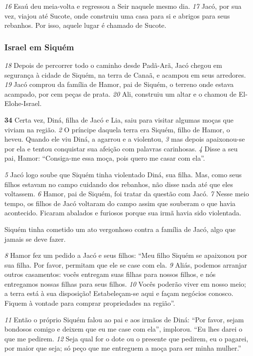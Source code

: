 \bigskip   
\textit{\tiny 16}
Esaú deu meia-volta e regressou a Seir naquele mesmo dia. 
\textit{\tiny 17}
Jacó, por sua
vez, viajou até Sucote, onde construiu uma casa para si e abrigos para seus
rebanhos. Por isso, aquele lugar é chamado de Sucote.

\bigskip   
\subsubsection*{Israel em Siquém}
\textit{\tiny 18}
Depois de percorrer todo o caminho desde Padã-Arã, Jacó chegou em
segurança à cidade de Siquém, na terra de Canaã, e acampou em seus arredores.
\textit{\tiny 19}
Jacó comprou da família de Hamor, pai de Siquém, o terreno onde estava
acampado, por cem peças de prata.
\textit{\tiny 20}
Ali, construiu um altar e o chamou de El-
Elohe-Israel.

\bigskip   
\textbf{\large 34}
 Certa vez, Diná, filha de Jacó e Lia, saiu para visitar algumas moças que
viviam na região. 
\textit{\tiny 2} 
O príncipe daquela terra era Siquém, filho de Hamor, o heveu.
Quando ele viu Diná, a agarrou e a violentou, 
\textit{\tiny 3} 
mas depois apaixonou-se por ela e
tentou conquistar sua afeição com palavras carinhosas. 
\textit{\tiny 4} 
Disse a seu pai, Hamor:
“Consiga-me essa moça, pois quero me casar com ela”. 

\bigskip   
\textit{\tiny 5} 
Jacó logo soube que Siquém tinha violentado Diná, sua filha. Mas, como seus
filhos estavam no campo cuidando dos rebanhos, não disse nada até que eles
voltassem. 
\textit{\tiny 6} 
Hamor, pai de Siquém, foi tratar da questão com Jacó. 
\textit{\tiny 7} 
Nesse meio tempo, os filhos de Jacó voltaram do campo assim que souberam o que havia
acontecido. Ficaram abalados e furiosos porque sua irmã havia sido violentada.

\bigskip   
Siquém tinha cometido um ato vergonhoso contra a família de Jacó,
 algo que
jamais se deve fazer. 

\bigskip   
\textit{\tiny 8} 
Hamor fez um pedido a Jacó e seus filhos: “Meu filho Siquém se apaixonou
por sua filha. Por favor, permitam que ele se case com ela. 
\textit{\tiny 9} 
Aliás, podemos
arranjar outros casamentos: vocês entregam suas filhas para nossos filhos, e nós
entregamos nossas filhas para seus filhos. 
\textit{\tiny 10}
Vocês poderão viver em nosso meio;
a terra está à sua disposição! Estabeleçam-se aqui e façam negócios conosco.
Fiquem à vontade para comprar propriedades na região”.
   
\bigskip   
\textit{\tiny 11}
Então o próprio Siquém falou ao pai e aos irmãos de Diná: “Por favor, sejam
bondosos comigo e deixem que eu me case com ela”, implorou. “Eu lhes darei o
que me pedirem. 
\textit{\tiny 12}
Seja qual for o dote ou o presente que pedirem, eu o pagarei,
por maior que seja; só peço que me entreguem a moça para ser minha mulher.”
   
